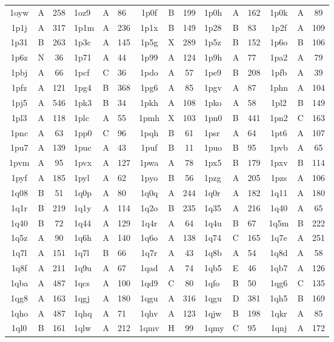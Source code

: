 \begin{longtable}{|c|c|c| a|a|a| c|c|c| a|a|a| c|c|c|}
1oyw & A & 258 & 1oz9 & A & 86 & 1p0f & B & 199 & 1p0h & A & 162 & 1p0k & A & 89\\
1p1j & A & 317 & 1p1m & A & 236 & 1p1x & B & 149 & 1p28 & B & 83 & 1p2f & A & 109\\
1p31 & B & 263 & 1p3c & A & 145 & 1p5g & X & 289 & 1p5z & B & 152 & 1p6o & B & 106\\
1p6z & N & 36 & 1p71 & A & 44 & 1p99 & A & 124 & 1p9h & A & 77 & 1pa2 & A & 79\\
1pbj & A & 66 & 1pcf & C & 36 & 1pdo & A & 57 & 1pe9 & B & 208 & 1pfb & A & 39\\
1pfz & A & 121 & 1pg4 & B & 368 & 1pg6 & A & 85 & 1pgv & A & 87 & 1phn & A & 104\\
1pj5 & A & 546 & 1pk3 & B & 34 & 1pkh & A & 108 & 1pko & A & 58 & 1pl2 & B & 149\\
1pl3 & A & 118 & 1plc & A & 55 & 1pmh & X & 103 & 1pn0 & B & 441 & 1pn2 & C & 163\\
1pnc & A & 63 & 1pp0 & C & 96 & 1pqh & B & 61 & 1psr & A & 64 & 1pt6 & A & 107\\
1pu7 & A & 139 & 1puc & A & 43 & 1puf & B & 11 & 1puo & B & 95 & 1pvb & A & 65\\
1pvm & A & 95 & 1pvx & A & 127 & 1pwa & A & 78 & 1px5 & B & 179 & 1pxv & B & 114\\
1pyf & A & 185 & 1pyl & A & 62 & 1pyo & B & 56 & 1pzg & A & 205 & 1pzs & A & 106\\
1q08 & B & 51 & 1q0p & A & 80 & 1q0q & A & 244 & 1q0r & A & 182 & 1q11 & A & 180\\
1q1r & B & 219 & 1q1y & A & 114 & 1q2o & B & 235 & 1q35 & A & 216 & 1q40 & A & 65\\
1q40 & B & 72 & 1q44 & A & 129 & 1q4r & A & 64 & 1q4u & B & 67 & 1q5m & B & 222\\
1q5z & A & 90 & 1q6h & A & 140 & 1q6o & A & 138 & 1q74 & C & 165 & 1q7e & A & 251\\
1q7l & A & 151 & 1q7l & B & 66 & 1q7r & A & 43 & 1q8b & A & 54 & 1q8d & A & 58\\
1q8f & A & 211 & 1q9u & A & 67 & 1qad & A & 74 & 1qb5 & E & 46 & 1qb7 & A & 126\\
1qba & A & 487 & 1qcs & A & 100 & 1qd9 & C & 80 & 1qfo & B & 50 & 1qg6 & C & 135\\
1qg8 & A & 163 & 1qgj & A & 180 & 1qgu & A & 316 & 1qgu & D & 381 & 1qh5 & B & 169\\
1qho & A & 487 & 1qhq & A & 71 & 1qhv & A & 123 & 1qjw & B & 198 & 1qkr & A & 85\\
1ql0 & B & 161 & 1qlw & A & 212 & 1qmv & H & 99 & 1qmy & C & 95 & 1qnj & A & 172\\

\end{longtable}

